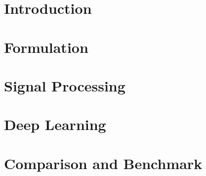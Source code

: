 \documentclass[harvard]{lincolncsuthesis}
\begin{document}
\maketitle

%






\thesisTables
\printnomenclature[3cm]
\setcounter{tocdepth}{4}
\setcounter{secnumdepth}{4}
\thesisBodyStart

\chapter{Introduction}


% 

\chapter{Formulation}


\chapter{Signal Processing}


\chapter{Deep Learning}


\chapter{Comparison and Benchmark}

\end{document}

